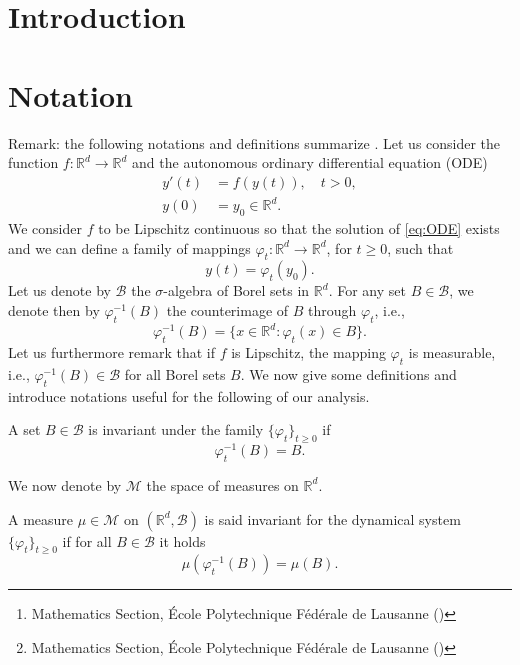 \documentclass{siamart1116}
\title{{\TheTitle}}
\author{Assyr Abdulle\thanks{Mathematics Section, \'Ecole Polytechnique F\'ed\'erale de Lausanne (\email{assyr.abdulle@epfl.ch})}
	\and
	Giacomo Garegnani\thanks{Mathematics Section, \'Ecole Polytechnique F\'ed\'erale de Lausanne (\email{giacomo.garegnani@epfl.ch})}}
\numberwithin{theorem}{section}
\renewcommand{\phi}{\varphi}
\newcommand{\R}{\mathbb{R}}
\newcommand{\Borel}{\mathcal{B}}
\begin{document}
	
\maketitle	

\begin{abstract}
\end{abstract}

\section{Introduction}

\section{Notation} Remark: the following notations and definitions summarize \cite{LaM94, DHJ97, EcR85}. Let us consider the function $f \colon \R^d \to \R^d$ and the autonomous ordinary differential equation (ODE)
\begin{equation}\label{eq:ODE}
\begin{aligned}
	y'(t) &= f(y(t)), \quad t > 0,\\
	y(0) &= y_0 \in \R^d. 	
\end{aligned}
\end{equation}
We consider $f$ to be Lipschitz continuous so that the solution of \eqref{eq:ODE} exists and we can define a family of mappings $\phi_t \colon \R^d \to \R^d$, for $t\geq 0$, such that
\begin{equation}\label{eq:ODEFlow}
	y(t) = \phi_t(y_0).
\end{equation}
Let us denote by $\Borel$ the $\sigma$-algebra of Borel sets in $\R^d$. For any set $B \in \mathcal{B}$, we denote then by $\phi_t^{-1}(B)$ the counterimage of $B$ through $\phi_t$, i.e., 
\begin{equation}
	\phi_t^{-1}(B) = \{x\in\R^d\colon \phi_t(x) \in B\}.
\end{equation}
Let us furthermore remark that if $f$ is Lipschitz, the mapping $\phi_t$ is measurable, i.e., $\phi_t^{-1}(B) \in \Borel$ for all Borel sets $B$. We now give some definitions and introduce notations useful for the following of our analysis.
\begin{definition} A set $B \in \Borel$ is invariant under the family $\{\phi_t\}_{t\geq 0}$ if 
	\begin{equation}
		\phi_t^{-1}(B) = B.
	\end{equation}
\end{definition}
We now denote by $\mathcal{M}$ the space of measures on $\R^d$.
\begin{definition} A measure $\mu \in \mathcal{M}$ on $(\R^d, \Borel)$ is said invariant for the dynamical system $\{\phi_t\}_{t\geq 0}$ if for all $B \in \Borel$ it holds
	\begin{equation}
		\mu(\phi^{-1}_t(B)) = \mu(B).
	\end{equation}
\end{definition}
\end{document}
